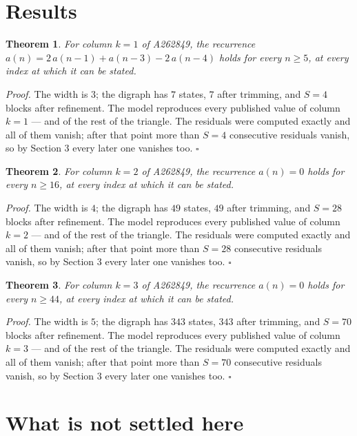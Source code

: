 \documentclass[11pt]{article}
\newtheorem{theorem}{Theorem}
\theoremstyle{definition}
\begin{document}
\section{Results}

\begin{theorem} For column $k = 1$ of A262849, the recurrence $a(n) = 2\,a(n-1) + a(n-3) - 2\,a(n-4)$ holds for every $n \ge 5$, at every index at which it can be stated.\end{theorem}

{\itshape Proof.} The width is $3$; the digraph has $7$ states, $7$ after trimming, and $S = 4$ blocks after refinement. The model reproduces every published value of column $k = 1$ --- and of the rest of the triangle. The residuals were computed exactly and all of them vanish; after that point more than $S = 4$ consecutive residuals vanish, so by Section 3 every later one vanishes too. $\square$

\begin{theorem} For column $k = 2$ of A262849, the recurrence $a(n) = 0$ holds for every $n \ge 16$, at every index at which it can be stated.\end{theorem}

{\itshape Proof.} The width is $4$; the digraph has $49$ states, $49$ after trimming, and $S = 28$ blocks after refinement. The model reproduces every published value of column $k = 2$ --- and of the rest of the triangle. The residuals were computed exactly and all of them vanish; after that point more than $S = 28$ consecutive residuals vanish, so by Section 3 every later one vanishes too. $\square$

\begin{theorem} For column $k = 3$ of A262849, the recurrence $a(n) = 0$ holds for every $n \ge 44$, at every index at which it can be stated.\end{theorem}

{\itshape Proof.} The width is $5$; the digraph has $343$ states, $343$ after trimming, and $S = 70$ blocks after refinement. The model reproduces every published value of column $k = 3$ --- and of the rest of the triangle. The residuals were computed exactly and all of them vanish; after that point more than $S = 70$ consecutive residuals vanish, so by Section 3 every later one vanishes too. $\square$

\section{What is not settled here}
\end{document}

